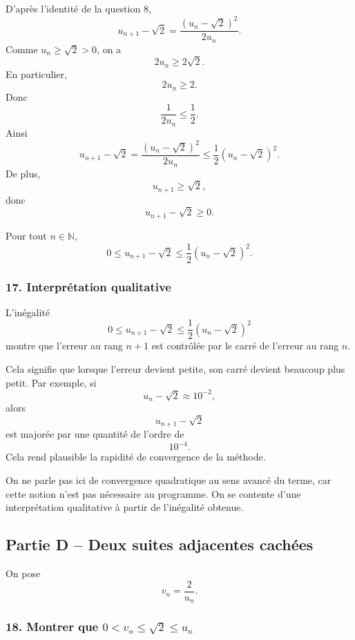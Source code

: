 \documentclass[11pt,a4paper]{article}
\newcommand{\N}{\mathbb{N}}
\begin{document}
D'après l'identité de la question 8,
\[
u_{n+1}-\sqrt2
=
\frac{(u_n-\sqrt2)^2}{2u_n}.
\]
Comme \(u_n\geq\sqrt2>0\), on a
\[
2u_n\geq 2\sqrt2.
\]
En particulier,
\[
2u_n\geq 2.
\]
Donc
\[
\frac1{2u_n}\leq \frac12.
\]
Ainsi
\[
u_{n+1}-\sqrt2
=
\frac{(u_n-\sqrt2)^2}{2u_n}
\leq
\frac12 (u_n-\sqrt2)^2.
\]
De plus,
\[
u_{n+1}\geq \sqrt2,
\]
donc
\[
u_{n+1}-\sqrt2\geq 0.
\]

\begin{resultatbox}
Pour tout \(n\in\N\),
\[
0\leq u_{n+1}-\sqrt2
\leq
\frac12 (u_n-\sqrt2)^2.
\]
\end{resultatbox}


\subsubsection*{17. Interprétation qualitative}

L'inégalité
\[
0\leq u_{n+1}-\sqrt2
\leq
\frac12 (u_n-\sqrt2)^2
\]
montre que l'erreur au rang \(n+1\) est contrôlée par le carré de l'erreur au rang \(n\).

Cela signifie que lorsque l'erreur devient petite, son carré devient beaucoup plus petit. Par exemple, si
\[
u_n-\sqrt2\approx 10^{-2},
\]
alors
\[
u_{n+1}-\sqrt2
\]
est majorée par une quantité de l'ordre de
\[
10^{-4}.
\]
Cela rend plausible la rapidité de convergence de la méthode.

\begin{remarquebox}
On ne parle pas ici de convergence quadratique au sens avancé du terme, car cette notion n'est pas nécessaire au programme. On se contente d'une interprétation qualitative à partir de l'inégalité obtenue.
\end{remarquebox}


\subsection*{Partie D -- Deux suites adjacentes cachées}

On pose
\[
v_n=\frac2{u_n}.
\]


\subsubsection*{18. Montrer que \(0<v_n\leq\sqrt2\leq u_n\)}
\end{document}
